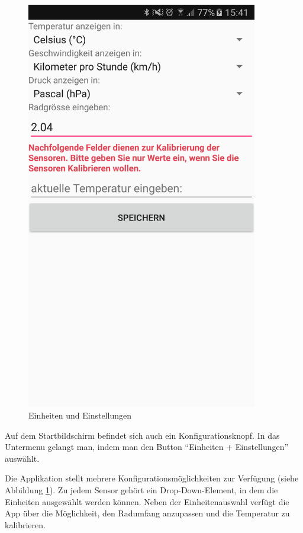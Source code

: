 \begin{figure}[ht]
\begin{minipage}[t]{0.5\textwidth}
    \includegraphics[width=0.9\textwidth]{4Resultate/imag/BLEEinheitenUndEinstellungenStart.png} 
    \caption{Einheiten und Einstellungen}
    \label{einheiten}
 \end{minipage}
\end{figure}

Auf dem Startbildschirm befindet sich auch ein Konfigurationsknopf. In das Untermenu gelangt man, indem man den Button ``Einheiten + Einstellungen'' auswählt.

Die Applikation stellt mehrere Konfigurationsmöglichkeiten zur Verfügung (siehe Abbildung \ref{einheiten}). Zu jedem Sensor gehört ein Drop-Down-Element, in dem die Einheiten ausgewählt werden können. Neben der Einheitenauswahl verfügt die App über die Möglichkeit, den Radumfang anzupassen und die Temperatur zu kalibrieren. 


